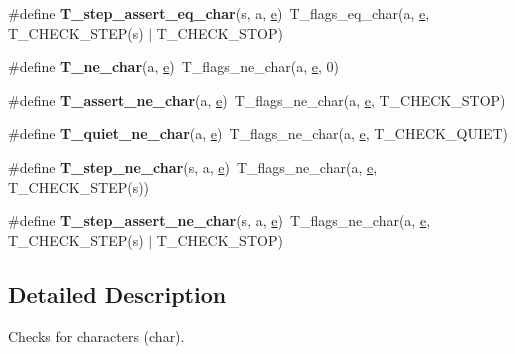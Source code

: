 \begin{DoxyCompactItemize}
\item 
\mbox{\label{group__RTEMSTestFrameworkChecksChar_ga5e9a21f8801ee15385d21691a1de28c0}} 
\#define {\bfseries T\+\_\+step\+\_\+assert\+\_\+eq\+\_\+char}(s,  a,  \mbox{\hyperlink{sun4u_2tte_8h_a8b0b9ed08e0e18920ec2682f48228c27}{e}})~T\+\_\+flags\+\_\+eq\+\_\+char(a, \mbox{\hyperlink{sun4u_2tte_8h_a8b0b9ed08e0e18920ec2682f48228c27}{e}}, T\+\_\+\+C\+H\+E\+C\+K\+\_\+\+S\+T\+EP(s) $\vert$ T\+\_\+\+C\+H\+E\+C\+K\+\_\+\+S\+T\+OP)
\item 
\mbox{\label{group__RTEMSTestFrameworkChecksChar_ga1ee1e80eb0dcad407a4c0144b000d5f3}} 
\#define {\bfseries T\+\_\+ne\+\_\+char}(a,  \mbox{\hyperlink{sun4u_2tte_8h_a8b0b9ed08e0e18920ec2682f48228c27}{e}})~T\+\_\+flags\+\_\+ne\+\_\+char(a, \mbox{\hyperlink{sun4u_2tte_8h_a8b0b9ed08e0e18920ec2682f48228c27}{e}}, 0)
\item 
\mbox{\label{group__RTEMSTestFrameworkChecksChar_gad4ce66d4c8f670f030aa510f06d166fc}} 
\#define {\bfseries T\+\_\+assert\+\_\+ne\+\_\+char}(a,  \mbox{\hyperlink{sun4u_2tte_8h_a8b0b9ed08e0e18920ec2682f48228c27}{e}})~T\+\_\+flags\+\_\+ne\+\_\+char(a, \mbox{\hyperlink{sun4u_2tte_8h_a8b0b9ed08e0e18920ec2682f48228c27}{e}}, T\+\_\+\+C\+H\+E\+C\+K\+\_\+\+S\+T\+OP)
\item 
\mbox{\label{group__RTEMSTestFrameworkChecksChar_ga1cef09ea388ff2c99383ffbe0c36cfbd}} 
\#define {\bfseries T\+\_\+quiet\+\_\+ne\+\_\+char}(a,  \mbox{\hyperlink{sun4u_2tte_8h_a8b0b9ed08e0e18920ec2682f48228c27}{e}})~T\+\_\+flags\+\_\+ne\+\_\+char(a, \mbox{\hyperlink{sun4u_2tte_8h_a8b0b9ed08e0e18920ec2682f48228c27}{e}}, T\+\_\+\+C\+H\+E\+C\+K\+\_\+\+Q\+U\+I\+ET)
\item 
\mbox{\label{group__RTEMSTestFrameworkChecksChar_ga7234376f1217a52aa006983663d6dbb2}} 
\#define {\bfseries T\+\_\+step\+\_\+ne\+\_\+char}(s,  a,  \mbox{\hyperlink{sun4u_2tte_8h_a8b0b9ed08e0e18920ec2682f48228c27}{e}})~T\+\_\+flags\+\_\+ne\+\_\+char(a, \mbox{\hyperlink{sun4u_2tte_8h_a8b0b9ed08e0e18920ec2682f48228c27}{e}}, T\+\_\+\+C\+H\+E\+C\+K\+\_\+\+S\+T\+EP(s))
\item 
\mbox{\label{group__RTEMSTestFrameworkChecksChar_ga5bb25f49acfb5ce3f977d7760e0de12e}} 
\#define {\bfseries T\+\_\+step\+\_\+assert\+\_\+ne\+\_\+char}(s,  a,  \mbox{\hyperlink{sun4u_2tte_8h_a8b0b9ed08e0e18920ec2682f48228c27}{e}})~T\+\_\+flags\+\_\+ne\+\_\+char(a, \mbox{\hyperlink{sun4u_2tte_8h_a8b0b9ed08e0e18920ec2682f48228c27}{e}}, T\+\_\+\+C\+H\+E\+C\+K\+\_\+\+S\+T\+EP(s) $\vert$ T\+\_\+\+C\+H\+E\+C\+K\+\_\+\+S\+T\+OP)
\end{DoxyCompactItemize}


\subsection{Detailed Description}
Checks for characters (char). 

